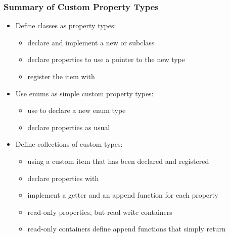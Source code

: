 \begin{slide}[fragile]\frametitle{Summary of Custom Property Types}

\begin{itemize}
\item Define classes as property types:
  \begin{itemize}
  \item declare and implement a new  or  subclass
  \item declare properties to use a pointer to the new type
  \item register the item with 
  \end{itemize}
\vspace*{1em}
\item Use enums as simple custom property types:
  \begin{itemize}
  \item use  to declare a new enum type
  \item declare properties as usual
  \end{itemize}
\vspace*{1em}
\item Define collections of custom types:
  \begin{itemize}
  \item using a custom item that has been declared and registered
  \item declare properties with 
  \item implement a getter and an append function for each property
  \item read-only properties, but read-write containers
  \item read-only containers define append functions that simply return
  \end{itemize}
\end{itemize}

\end{slide}


